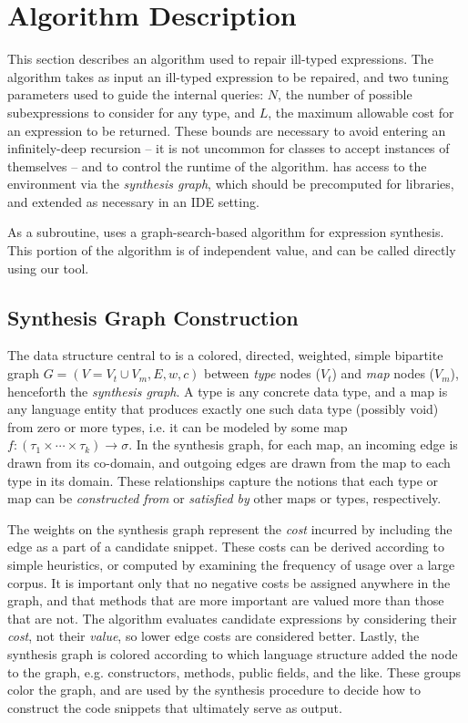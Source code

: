 \section{Algorithm Description}
\label{sec:algorithm}

This section describes an algorithm used to repair ill-typed expressions. The algorithm takes as input an ill-typed expression to be repaired, and two tuning parameters used to guide the internal queries: $N$, the number of possible subexpressions to consider for any type, and $L$, the maximum allowable cost for an expression to be returned. These bounds are necessary to avoid entering an infinitely-deep recursion -- it is not uncommon for classes to accept instances of themselves -- and to control the runtime of the algorithm. \ourTool has access to the environment via the \textit{synthesis graph}, which should be precomputed for libraries, and extended as necessary in an IDE setting.

As a subroutine, \ourTool uses a graph-search-based algorithm for expression synthesis. This portion of the algorithm is of independent value, and can be called directly using our tool.

\subsection{Synthesis Graph Construction}
\label{sec:algorithm:graph}

The data structure central to \ourTool is a colored, directed, weighted, simple bipartite graph $G = (V = V_t \cup V_m, E, w, c)$ between \textit{type} nodes ($V_t$) and \textit{map} nodes ($V_m$), henceforth the \textit{synthesis graph}. A type is any concrete data type, and a map is any language entity that produces exactly one such data type (possibly void) from zero or more types, i.e. it can be modeled by some map $f : (\tau_1 \times \cdots \times \tau_k) \to \sigma$. In the synthesis graph, for each map, an incoming edge is drawn from its co-domain, and outgoing edges are drawn from the map to each type in its domain. These relationships capture the notions that each type or map can be \textit{constructed from} or \textit{satisfied by} other maps or types, respectively.

The weights on the synthesis graph represent the \textit{cost} incurred by including the edge as a part of a candidate snippet. These costs can be derived according to simple heuristics, or computed by examining the frequency of usage over a large corpus. It is important only that no negative costs be assigned anywhere in the graph, and that methods that are more important are valued more than those that are not. The algorithm evaluates candidate expressions by considering their \textit{cost}, not their \textit{value}, so lower edge costs are considered better. Lastly, the synthesis graph is colored according to which language structure added the node to the graph, e.g. constructors, methods, public fields, and the like. These groups color the graph, and are used by the synthesis procedure to decide how to construct the code snippets that ultimately serve as output.

